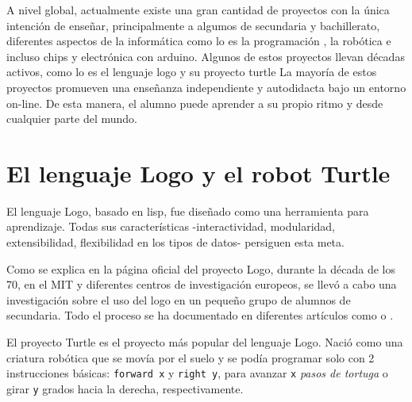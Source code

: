 A nivel global, actualmente existe una gran cantidad de proyectos con la única intención de enseñar, principalmente a algumos de secundaria y bachillerato, diferentes aspectos de la informática como lo es la programación \cite{code-school,code-org,code-academy}, la robótica \cite{robomind-web,moway} e incluso chips y electrónica con \Gls{arduino}\cite{arduino}. Algunos de estos proyectos llevan décadas activos, como lo es el lenguaje \Gls{logo}\cite{logo} y su proyecto \Gls{turtle}\cite{logo-turtle}
La mayoría de estos proyectos promueven una enseñanza independiente y autodidacta bajo un entorno on-line. De esta manera, el alumno puede aprender a su propio ritmo y desde cualquier parte del mundo.


\section{El lenguaje Logo y el robot Turtle}
\label{sec:Logo}

El lenguaje Logo, basado en \Gls{lisp}, fue diseñado como una herramienta para aprendizaje. Todas sus características -interactividad, modularidad, extensibilidad, flexibilidad en los tipos de datos- persiguen esta meta.


Como se explica en la página oficial del proyecto Logo\cite{logo}, durante la década de los 70, en el \acrfull{MIT} y diferentes centros de investigación europeos, se llevó a cabo una investigación sobre el uso del \Gls{logo} en un pequeño grupo de alumnos de secundaria. Todo el proceso se ha documentado en diferentes artículos como \cite{feurzeig1969programming} o \cite{pea1984logo}.


El proyecto Turtle es el proyecto más popular del lenguaje Logo. Nació como una criatura robótica que se movía por el suelo y se podía programar solo con 2 instrucciones básicas: \texttt{forward x} y \texttt{right y}, para avanzar \texttt{x} \emph{pasos de tortuga} o girar \texttt{y} grados hacia la derecha, respectivamente.

